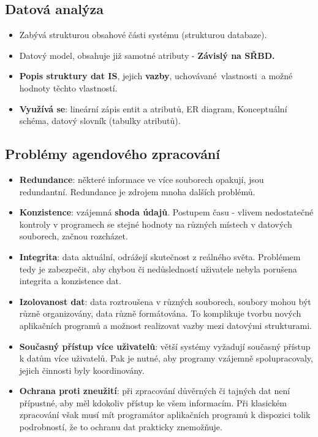 \subsection*{Datová analýza}
\begin{itemize}
\item Zabývá strukturou obsahové části systému (strukturou databaze).
\item Datový model, obsahuje již samotné atributy - \textbf{Závislý na SŘBD.}
\item \textbf{Popis struktury dat IS}, jejich \textbf{vazby}, uchovávané vlastnosti a možné hodnoty těchto vlastností.
\item \textbf{Využívá se}: lineární zápis entit a atributů, ER diagram, {Konceptuální} schéma, {datový slovník} (tabulky atributů).
\end{itemize}


\subsection*{Problémy agendového zpracování}
\begin{itemize}
\item\textbf{Redundance}: některé informace ve více souborech opakují, jsou redundantní. Redundance je zdrojem mnoha dalších problémů.
\item\textbf{Konzistence}: vzájemná \textbf{shoda údajů}. Postupem času - vlivem nedostatečné kontroly v programech se stejné hodnoty na různých místech v datových souborech, začnou rozcházet.
\item\textbf{Integrita}: data aktuální, odrážejí skutečnost z reálného světa. Problémem tedy je zabezpečit, aby chybou či nedůsledností uživatele nebyla porušena integrita a konzistence dat.
\item\textbf{Izolovanost dat}:  data roztroušena v různých souborech, soubory mohou být různě organizovány, data různě formátována. To komplikuje tvorbu nových aplikačních programů a možnost realizovat vazby mezi datovými strukturami.
\item\textbf{Současný přístup více uživatelů}: větší systémy vyžadují současný přístup k datům více uživatelů. Pak je nutné, aby programy vzájemně spolupracovaly, jejich činnosti byly koordinovány.
\item\textbf{Ochrana proti zneužití}: při zpracování důvěrných či tajných dat není přípustné, aby měl kdokoliv přístup ke všem informacím. Při klasickém zpracování však musí mít programátor aplikačních programů k dispozici tolik podrobností, že to ochranu dat prakticky znemožňuje.
\end{itemize}
